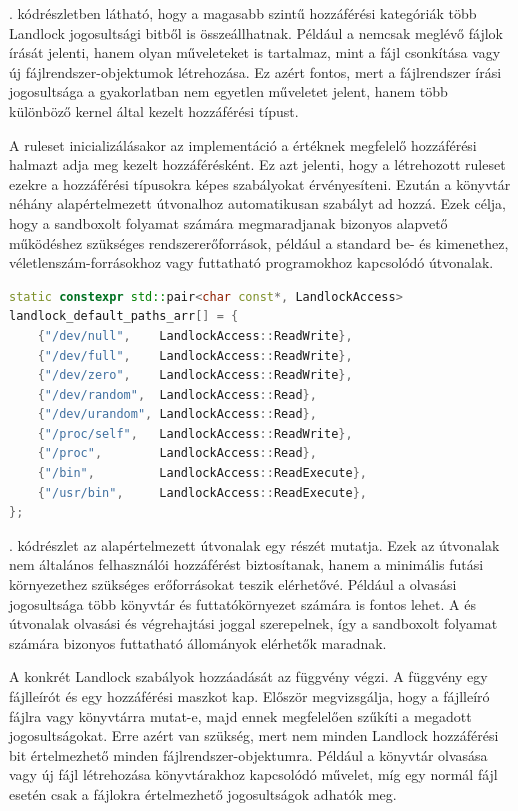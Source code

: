 . kódrészletben látható, hogy a magasabb szintű
hozzáférési kategóriák több Landlock jogosultsági bitből is összeállhatnak.
Például a  nemcsak meglévő fájlok írását jelenti, hanem olyan
műveleteket is tartalmaz, mint a fájl csonkítása vagy új fájlrendszer-objektumok
létrehozása. Ez azért fontos, mert a fájlrendszer írási jogosultsága a
gyakorlatban nem egyetlen műveletet jelent, hanem több különböző kernel által
kezelt hozzáférési típust.

A ruleset inicializálásakor az implementáció a 
értéknek megfelelő hozzáférési halmazt adja meg kezelt hozzáférésként. Ez azt
jelenti, hogy a létrehozott ruleset ezekre a hozzáférési típusokra képes
szabályokat érvényesíteni. Ezután a könyvtár néhány alapértelmezett útvonalhoz
automatikusan szabályt ad hozzá. Ezek célja, hogy a sandboxolt folyamat számára
megmaradjanak bizonyos alapvető működéshez szükséges rendszererőforrások,
például a standard be- és kimenethez, véletlenszám-forrásokhoz vagy futtatható
programokhoz kapcsolódó útvonalak.

\begin{lstlisting}[float, language=C++, caption={Alapértelmezett Landlock útvonalak}, label={lst:landlock-default-paths}]
static constexpr std::pair<char const*, LandlockAccess>
landlock_default_paths_arr[] = {
    {"/dev/null",    LandlockAccess::ReadWrite},
    {"/dev/full",    LandlockAccess::ReadWrite},
    {"/dev/zero",    LandlockAccess::ReadWrite},
    {"/dev/random",  LandlockAccess::Read},
    {"/dev/urandom", LandlockAccess::Read},
    {"/proc/self",   LandlockAccess::ReadWrite},
    {"/proc",        LandlockAccess::Read},
    {"/bin",         LandlockAccess::ReadExecute},
    {"/usr/bin",     LandlockAccess::ReadExecute},
};
\end{lstlisting}

. kódrészlet az alapértelmezett útvonalak egy
részét mutatja. Ezek az útvonalak nem általános felhasználói hozzáférést
biztosítanak, hanem a minimális futási környezethez szükséges erőforrásokat
teszik elérhetővé. Például a  olvasási jogosultsága több
könyvtár és futtatókörnyezet számára is fontos lehet. A  és
 útvonalak olvasási és végrehajtási joggal szerepelnek, így a
sandboxolt folyamat számára bizonyos futtatható állományok elérhetők maradnak.

A konkrét Landlock szabályok hozzáadását az 
függvény végzi. A függvény egy fájlleírót és egy hozzáférési maszkot kap. Először
megvizsgálja, hogy a fájlleíró fájlra vagy könyvtárra mutat-e, majd ennek
megfelelően szűkíti a megadott jogosultságokat. Erre azért van szükség, mert
nem minden Landlock hozzáférési bit értelmezhető minden fájlrendszer-objektumra.
Például a könyvtár olvasása vagy új fájl létrehozása könyvtárakhoz kapcsolódó
művelet, míg egy normál fájl esetén csak a fájlokra értelmezhető jogosultságok
adhatók meg.

